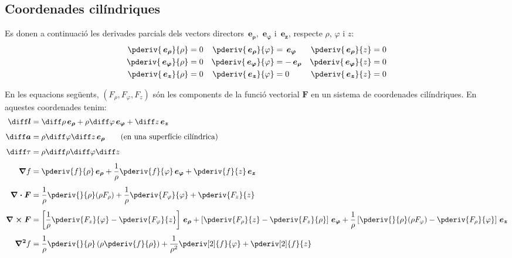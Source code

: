 \documentclass[catalan,a4paper,twoside,11pt]{article}
\begin{document}
\subsection{Coordenades cilíndriques}

\renewcommand{\va}{\ensuremath{\,\boldsymbol{e_\rho}}}
\renewcommand{\vb}{\ensuremath{\,\boldsymbol{e_\varphi}}}
\renewcommand{\vc}{\ensuremath{\,\boldsymbol{e_z}}}

Es donen a continuació les derivades parcials dels vectors directors $\va$, $\vb$ i $\vc$, respecte $\rho$, $\varphi$ i $z$:
\begin{subequations}
\begin{align}
   \pderiv{\va}{\rho} &= 0 & \pderiv{\va}{\varphi} &= \vb  & \pderiv{\va}{z} &= 0 \\
   \pderiv{\vb}{\rho} &= 0 & \pderiv{\vb}{\varphi} &= -\va & \pderiv{\vb}{z} &= 0 \\
   \pderiv{\vc}{\rho} &= 0 & \pderiv{\vc}{\varphi} &= 0    & \pderiv{\vc}{z} &= 0
\end{align}
\end{subequations}

En les equacions següents, $(F_\rho,F_\varphi,F_z)$  són les
components de la funció vectorial   $\boldsymbol{F}$ en un sistema de
coordenades cilíndriques. En aquestes coordenades tenim:
\begin{align}
    \boldsymbol{\diff l} &= \diff \rho \va + \rho\diff \varphi \vb + \diff z \vc\\[1ex]
    \boldsymbol{\diff a} &= \rho\diff \varphi \diff z \va\qquad\text{(en una superfície cilíndrica)}\\[1ex]
    \diff\tau &= \rho \diff \rho \diff \varphi \diff z\\[1ex]
    \boldsymbol{\nabla}f &= \pderiv{f}{\rho}\va + \frac{1}{\rho}\pderiv{f}{\varphi}\vb
    + \pderiv{f}{z}\vc\\[1ex]
    \boldsymbol{\nabla\cdot F} &= \frac{1}{\rho}\pderiv{}{\rho}(\rho F_\rho) +
    \frac{1}{\rho}\pderiv{F_\varphi}{\varphi}+ \pderiv{F_z}{z}\\[1ex]
    \boldsymbol{\nabla\times F} &= \left[\frac{1}{\rho}\pderiv{F_z}{\varphi}-
    \pderiv{F_\varphi}{z}\right]\va +
    \left[\pderiv{F_\rho}{z}-\pderiv{F_z}{\rho}\right]\vb +
    \frac{1}{\rho}\left[\pderiv{}{\rho}(\rho F_\varphi)-\pderiv{F_\rho}{\varphi}\right]\vc\\[1ex]
    \boldsymbol{\nabla^2}f &= \frac{1}{\rho}\pderiv{}{\rho}\left(\rho\pderiv{f}{\rho}
    \right)
    + \frac{1}{\rho^2}\pderiv[2]{f}{\varphi}+ \pderiv[2]{f}{z}
\end{align}
\end{document}
